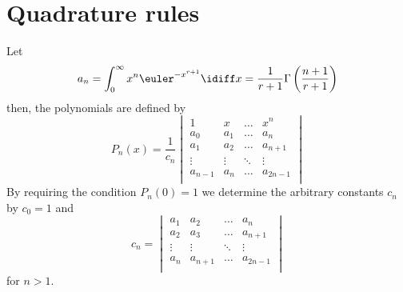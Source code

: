 \section{Quadrature rules}
Let
\begin{equation*}
	a_n = \int_0^\infty x^n\euler^{-x^{r+1}}\idiff x=\frac{1}{r+1}\Gamma\left(\frac{n+1}{r+1}\right)
\end{equation*}
then, the polynomials are defined by
\begin{equation*}
	P_n(x) = \frac{1}{c_n}\begin{vmatrix}
		1 & x & \dots & x^n\\
		a_0 & a_1 & \dots & a_n\\
		a_1 & a_2 & \dots & a_{n+1}\\
		\vdots & \vdots & \ddots & \vdots\\
		a_{n-1} & a_n & \dots & a_{2n-1}\\
	\end{vmatrix}
\end{equation*}
By requiring the condition $P_n(0) = 1$ we determine the arbitrary constants $c_n$ by $c_0=1$ and
\begin{equation*}
	c_n = \begin{vmatrix}
		a_1 & a_2 & \dots & a_n\\
		a_2 & a_3 & \dots & a_{n+1}\\
		\vdots & \vdots & \ddots & \vdots\\
		a_n & a_{n+1} & \dots & a_{2n-1}\\
	\end{vmatrix}	
\end{equation*}
for $n>1$.

